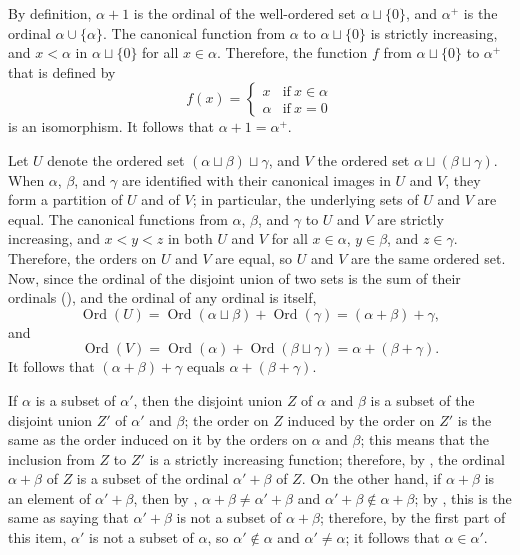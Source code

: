 \documentclass{article}
\begin{document}
By definition, \(\alpha + 1\) is the ordinal of the well-ordered set
\(\alpha \sqcup \{0\}\), and \(\alpha^+\) is the ordinal
\(\alpha \cup \{\alpha\}\).  The canonical function from \(\alpha\) to
\(\alpha \sqcup \{0\}\) is strictly increasing, and \(x < \alpha\) in
\(\alpha \sqcup \{0\}\) for all \(x \in \alpha\).  Therefore, the
function \(f\) from \(\alpha \sqcup \{0\}\) to \(\alpha^+\) that is
defined by
\begin{displaymath}
  f(x) =
  \begin{cases}
    x & \text{if} ~ x \in \alpha \\
    \alpha & \text{if} ~ x = 0
  \end{cases}
\end{displaymath}
is an isomorphism.  It follows that \(\alpha + 1 = \alpha^+\).

Let \(U\) denote the ordered set
\((\alpha \sqcup \beta) \sqcup \gamma\), and \(V\) the ordered set
\(\alpha \sqcup (\beta \sqcup \gamma)\).  When \(\alpha\), \(\beta\),
and \(\gamma\) are identified with their canonical images in \(U\) and
\(V\), they form a partition of \(U\) and of \(V\); in particular, the
underlying sets of \(U\) and \(V\) are equal.  The canonical functions
from \(\alpha\), \(\beta\), and \(\gamma\) to \(U\) and \(V\) are
strictly increasing, and \(x < y < z\) in both \(U\) and \(V\) for all
\(x \in \alpha\), \(y \in \beta\), and \(z \in \gamma\).  Therefore,
the orders on \(U\) and \(V\) are equal, so \(U\) and \(V\) are the
same ordered set.  Now, since the ordinal of the disjoint union of two
sets is the sum of their ordinals (), and the
ordinal of any ordinal is itself,
\begin{displaymath}
  \operatorname{Ord}(U)
  =
  \operatorname{Ord}(\alpha \sqcup \beta) + \operatorname{Ord}(\gamma)
  =
  (\alpha + \beta) + \gamma,
\end{displaymath}
and
\begin{displaymath}
  \operatorname{Ord}(V)
  =
  \operatorname{Ord}(\alpha) + \operatorname{Ord}(\beta \sqcup \gamma)
  =
  \alpha + (\beta + \gamma).
\end{displaymath}
It follows that \((\alpha + \beta) + \gamma\) equals
\(\alpha + (\beta + \gamma)\).

If \(\alpha\) is a subset of \(\alpha'\), then the disjoint union
\(Z\) of \(\alpha\) and \(\beta\) is a subset of the disjoint union
\(Z'\) of \(\alpha'\) and \(\beta\); the order on \(Z\) induced by the
order on \(Z'\) is the same as the order induced on it by the orders
on \(\alpha\) and \(\beta\); this means that the inclusion from \(Z\)
to \(Z'\) is a strictly increasing function; therefore, by
, the ordinal \(\alpha + \beta\) of \(Z\) is a
subset of the ordinal \(\alpha' + \beta\) of \(Z\).  On the other
hand, if \(\alpha + \beta\) is an element of \(\alpha' + \beta\), then
by , \(\alpha + \beta \neq \alpha' + \beta\) and
\(\alpha' + \beta \notin \alpha + \beta\); by ,
this is the same as saying that \(\alpha' + \beta\) is not a subset of
\(\alpha + \beta\); therefore, by the first part of this item,
\(\alpha'\) is not a subset of \(\alpha\), so
\(\alpha' \notin \alpha\) and \(\alpha' \neq \alpha\); it follows that
\(\alpha \in \alpha'\).
\end{document}
